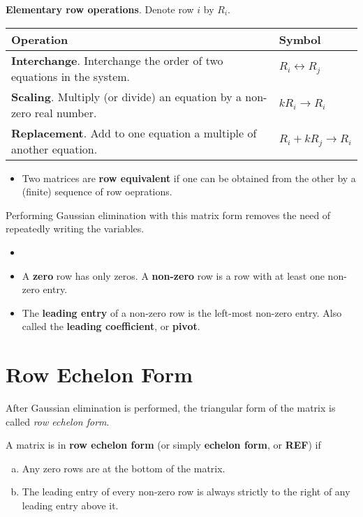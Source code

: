 \documentclass[letterpaper,12pt]{article}
\begin{document}
\begin{definition}
\textbf{Elementary row operations}. Denote row $i$ by $R_i$.
\begin{table}[H]
    \centering
    \begin{tabular}{l|l}
        Operation & Symbol \\ \hline
        \textbf{Interchange}. Interchange the order of two equations in the system. & $R_i \leftrightarrow R_j$ \\
        \textbf{Scaling}. Multiply (or divide) an equation by a non-zero real number. & $kR_i \rightarrow R_i$ \\
        \textbf{Replacement}. Add to one equation a multiple of another equation. & $R_i + kR_j \rightarrow R_i$
    \end{tabular}
\end{table}
\begin{itemize}
    \item Two matrices are \textbf{row equivalent} if one can be obtained from the other by a (finite) sequence of row oeprations.
\end{itemize}
\end{definition}

Performing Gaussian elimination with this matrix form removes the need of repeatedly writing the variables.

\begin{definition}
\begin{itemize}
    \item[]
    \item A \textbf{zero} row has only zeros. A \textbf{non-zero} row is a row with at least one non-zero entry. 
    \item The \textbf{leading entry} of a non-zero row is the left-most non-zero entry. Also called the \textbf{leading coefficient}, or \textbf{pivot}.
\end{itemize}
\end{definition}

\section*{Row Echelon Form}
After Gaussian elimination is performed, the triangular form of the matrix is called \textit{row echelon form}.

\begin{definition}
A matrix is in \textbf{row echelon form} (or simply \textbf{echelon form}, or \textbf{REF}) if
\begin{enumerate}[(a)]
    \item Any zero rows are at the bottom of the matrix.
    \item The leading entry of every non-zero row is always strictly to the right of any leading entry above it.
\end{enumerate}
\end{definition}
\end{document}

